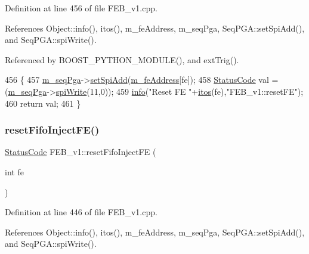Definition at line 456 of file F\+E\+B\+\_\+v1.\+cpp.



References Object\+::info(), itos(), m\+\_\+fe\+Address, m\+\_\+seq\+Pga, Seq\+P\+G\+A\+::set\+Spi\+Add(), and Seq\+P\+G\+A\+::spi\+Write().



Referenced by B\+O\+O\+S\+T\+\_\+\+P\+Y\+T\+H\+O\+N\+\_\+\+M\+O\+D\+U\+L\+E(), and ext\+Trig().


\begin{DoxyCode}
456                                 \{  
457   \hyperlink{classFEB__v1_a6c7804ac86796f233a8393043adf2e77}{m\_seqPga}->\hyperlink{classSeqPGA_ac998ce3a6d9b5f2e88cc8393f8c1df53}{setSpiAdd}(\hyperlink{classFEB__v1_a4e1945c2d5b434125f375e9d0fc6d99f}{m\_feAddress}[fe]);
458   \hyperlink{classStatusCode}{StatusCode} val = (\hyperlink{classFEB__v1_a6c7804ac86796f233a8393043adf2e77}{m\_seqPga}->\hyperlink{classSeqPGA_ad4421841ce4ce8b88ad13f63216f0743}{spiWrite}(11,0));
459   \hyperlink{classObject_a644fd329ea4cb85f54fa6846484b84a8}{info}(\textcolor{stringliteral}{"Reset FE "}+\hyperlink{Tools_8h_af330027dbdafb9a30768b3613c553e60}{itos}(fe),\textcolor{stringliteral}{"FEB\_v1::resetFE"});
460   \textcolor{keywordflow}{return} val;
461 \}
\end{DoxyCode}
\mbox{\label{classFEB__v1_a71d10a772bda2506fd7adb86739fb24d}} 
\subsubsection{\texorpdfstring{reset\+Fifo\+Inject\+F\+E()}{resetFifoInjectFE()}}
{\footnotesize\ttfamily \hyperlink{classStatusCode}{Status\+Code} F\+E\+B\+\_\+v1\+::reset\+Fifo\+Inject\+FE (\begin{DoxyParamCaption}\item[{int}]{fe }\end{DoxyParamCaption})}



Definition at line 446 of file F\+E\+B\+\_\+v1.\+cpp.



References Object\+::info(), itos(), m\+\_\+fe\+Address, m\+\_\+seq\+Pga, Seq\+P\+G\+A\+::set\+Spi\+Add(), and Seq\+P\+G\+A\+::spi\+Write().



